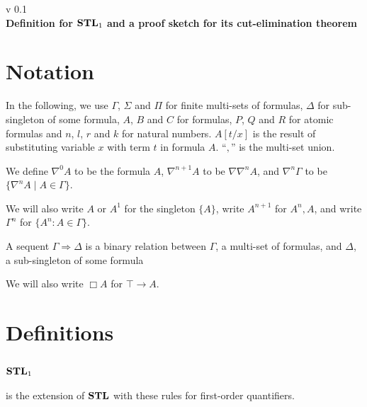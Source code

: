 \documentclass[a4paper, 12pt]{paper}
\begin{document}
{\noindent
	v 0.1 \\
{\large\textbf{Definition for $\mathbf{STL}_1$ and a proof sketch for its cut-elimination theorem}}
}
\\
\setcounter{section}{-1}
\section{Notation} In the following, we use $\Gamma$, $\Sigma$ and $\Pi$ for finite multi-sets of formulas, $\Delta$ for sub-singleton of some formula, $A$, $B$ and $C$ for formulas, $P$, $Q$ and $R$ for atomic formulas and $n$, $l$, $r$ and $k$ for natural numbers. $A[t/x]$ is the result of substituting variable $x$ with term $t$ in formula $A$.
``$,$'' is the multi-set union.

We define $\nabla^0 A$ to be the formula $A$, $\nabla^{n+1} A$ to be $\nabla \nabla^n A$, and $\nabla^n \Gamma$ to be $\{ \nabla^n A \mid A \in \Gamma \}$.

We will also write $A$ or $A^1$ for the singleton $\{A\}$, write $A^{n+1}$ for $A^n, A$, and write $\Gamma^n$ for $\{ A^n : A \in \Gamma \}$.

A sequent $\Gamma \Rightarrow \Delta$ is a binary relation between $\Gamma$, a multi-set of formulas, and $\Delta$, a sub-singleton of some formula

We will also write $\Box A$ for $\top \rightarrow A$.

\section{Definitions}

\subsection{$\mathbf{STL}_1$} is the extension of $\mathbf{STL}$ with these rules for first-order quantifiers.
\end{document}
